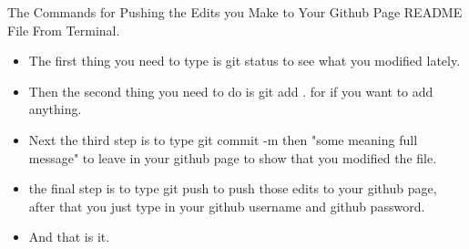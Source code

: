 \documentclass[aspectratio=43]{beamer}
\begin{document}
\begin{frame}{The Commands for Pushing the Edits you Make to Your Github Page README File From Terminal.}
\begin{itemize}
\item The first thing you need to type is git status to see what you modified lately.
\item Then the second thing you need to do is git add . for if you want to add anything.
\item Next the third step is to type git commit -m then "some meaning full message" to leave in your github page to show that you modified the file.
\item the final step is to type git push to push those edits to your github page, after that you just type in your github username and github password.
\item And that is it.
\end{itemize}
\end{frame}


%
\end{document}
